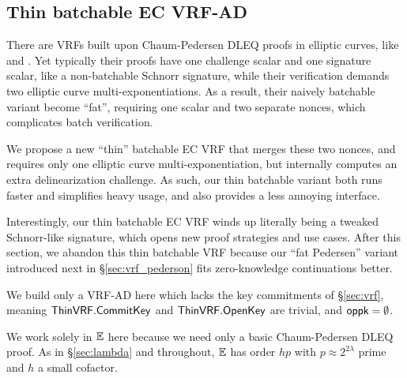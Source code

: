 \subsection{Thin batchable EC VRF-AD}
\label{sec:vrf_thin}

There are VRFs built upon Chaum-Pedersen DLEQ proofs in elliptic curves,
 like \cite{nsec5} and \cite{VXEd25519}.
Yet typically their proofs have one challenge scalar and one signature
scalar, like a non-batchable Schnorr signature, while 
their verification demands two elliptic curve multi-exponentiations.
As a result, their naively batchable variant become ``fat'', requiring
one scalar and two separate nonces, which complicates batch verification.

We propose a new ``thin'' batchable EC VRF that merges these two nonces,
and requires only one elliptic curve multi-exponentiation, but
internally computes an extra delinearization challenge.
As such, our thin batchable variant both runs faster and simplifies heavy usage,
and also provides a less annoying interface.

Interestingly, our thin batchable EC VRF winds up literally being
a tweaked Schnorr-like signature, which opens new proof strategies and
use cases.  After this section, we abandon this thin batchable VRF
because our ``fat Pedersen'' variant introduced next in \S\ref{sec:vrf_pederson}
fits zero-knowledge continuations better.

\smallskip

\newcommand{\ThinVRF}{\primalgo{ThinVRF}} 


We build only a VRF-AD here which lacks the key commitments of \S\ref{sec:vrf},
meaning $\ThinVRF.\CommitKey$ and $\ThinVRF.\OpenKey$ are trivial, and $\mathsf{oppk} = \emptyset$.

We work solely in ${\mathbb{E}}$ here because we need only a basic Chaum-Pedersen DLEQ proof.
As in \S\ref{sec:lambda} and throughout,
 ${\mathbb{E}}$ has order $h p$ with $p \approx 2^{2\lambda}$ prime and $h$ a small cofactor.

